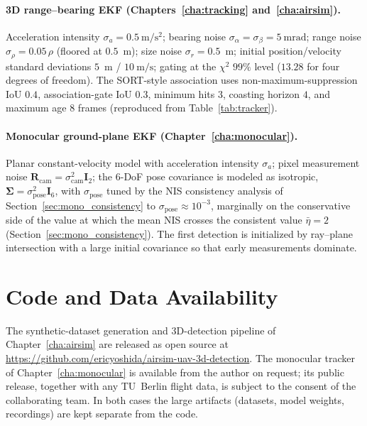\paragraph*{3D range--bearing EKF (Chapters~\ref{cha:tracking} and~\ref{cha:airsim}).}
Acceleration intensity $\sigma_a=0.5~\mathrm{m/s^2}$; bearing noise
$\sigma_\alpha=\sigma_\beta=5~\mathrm{mrad}$; range noise $\sigma_\rho=0.05\,\rho$
(floored at $0.5$~m); size noise $\sigma_r=0.5$~m; initial position/velocity
standard deviations $5$~m / $10~\mathrm{m/s}$; gating at the $\chi^2$ $99\%$ level
($13.28$ for four degrees of freedom). The SORT-style association uses
non-maximum-suppression IoU $0.4$, association-gate IoU $0.3$, minimum hits $3$,
coasting horizon $4$, and maximum age $8$ frames (reproduced from
Table~\ref{tab:tracker}).

\paragraph*{Monocular ground-plane EKF (Chapter~\ref{cha:monocular}).}
Planar constant-velocity model with acceleration intensity $\sigma_a$; pixel
measurement noise $\bm{R}_{\mathrm{cam}}=\sigma_{\mathrm{cam}}^2\bm{I}_2$; the
$6$-DoF pose covariance is modeled as isotropic,
$\bm{\Sigma}=\sigma_{\mathrm{pose}}^2\bm{I}_6$, with $\sigma_{\mathrm{pose}}$ tuned
by the NIS consistency analysis of Section~\ref{sec:mono_consistency} to
$\sigma_{\mathrm{pose}}\approx10^{-3}$, marginally on the conservative side of the
value at which the mean NIS crosses the consistent value $\bar\eta=2$
(Section~\ref{sec:mono_consistency}). The first detection is initialized by ray--plane
intersection with a large initial covariance so that early measurements dominate.

\section{Code and Data Availability}
\label{ap:code}

The synthetic-dataset generation and 3D-detection pipeline of
Chapter~\ref{cha:airsim} are released as open source at
\url{https://github.com/ericyoshida/airsim-uav-3d-detection}. The monocular
tracker of Chapter~\ref{cha:monocular} is available from the author on request;
its public release, together with any TU~Berlin flight data, is subject to the
consent of the collaborating team. In both cases the large artifacts (datasets,
model weights, recordings) are kept separate from the code.
